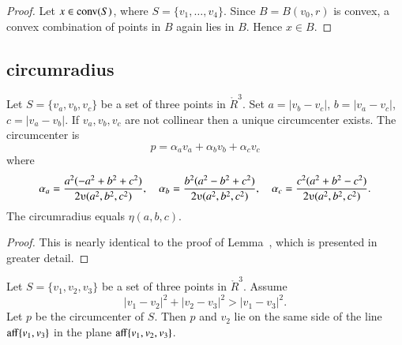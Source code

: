 \begin{tarskidata}
\begin{tarski}
\begin{proof}  Let $x\in {\operatorname{conv}}(S)$, where $S=\{v_1,\ldots,v_4\}$.
Since $B=B(v_0,r)$ is convex,  a convex combination of points in $B$
again lies in $B$.  Hence $x\in B$.
\end{proof}
\end{tarski}










\begin{tarski}
\subsection{circumradius}

\begin{lemma}
Let $S= \{v_a,v_b,v_c\}$ be a set of three points in $\ring{R}^3$.
Set $a = |v_b
- v_c|$, $b = |v_a - v_c|$, $c = |v_a  - v_b |$.  If $v_a,v_b,v_c$
are not collinear then a unique circumcenter exists.  The circumcenter is
    $$p = \alpha_a v_a + \alpha_b v_b + \alpha_c v_c$$
where
    $$%
    \alpha_a = \frac{a^2(- a^2 + b^2 + c^2)}{2\ups(a^2,b^2,c^2)},\quad
    \alpha_b = \frac{b^2(a^2 - b^2 + c^2)}{2\ups(a^2,b^2,c^2)},\quad
    \alpha_c = \frac{c^2(a^2 + b^2 - c^2)}{2\ups(a^2,b^2,c^2)}.
    $$
The circumradius equals $\eta(a,b,c)$.
\end{lemma}


\begin{proof} This is nearly identical to the proof of 
Lemma~, which is presented in greater detail.
\end{proof}
\end{tarski}




\begin{tarski}

\begin{lemma}
Let  $S=\{v_1,v_2,v_3\}$ be a set of three points
in $\ring{R}^3$. Assume 
   $$
   |v_1-v_2|^2 + |v_2-v_3|^2 > |v_1-v_3|^2.
   $$
Let $p$ be the circumcenter of $S$.
Then $p$ and $v_2$ lie on the same side of the line ${\operatorname{aff}}\{v_1,v_3\}$
in the plane ${\operatorname{aff}}\{v_1,v_2,v_3\}$.
\end{lemma}


\end{tarski}
\end{tarskidata}
